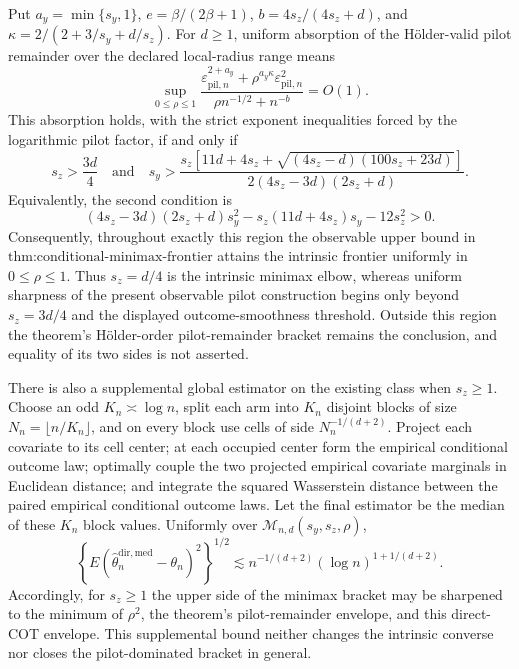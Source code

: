 Put \(a_y=\min\{s_y,1\}\), \(e=\beta/(2\beta+1)\), \(b=4s_z/(4s_z+d)\), and \(\kappa=2/(2+3/s_y+d/s_z)\).  For \(d\ge1\), uniform absorption of the H\"older-valid pilot remainder over the declared local-radius range means
\[
\sup_{0\le\rho\le1}
\frac{\varepsilon_{\mathrm{pil},n}^{2+a_y}+\rho^{a_y\kappa}\varepsilon_{\mathrm{pil},n}^2}
{\rho n^{-1/2}+n^{-b}}=O(1).
\]
This absorption holds, with the strict exponent inequalities forced by the logarithmic pilot factor, if and only if
\[
s_z>\frac{3d}{4}
\quad\text{and}\quad
s_y>
\frac{s_z\!\left[11d+4s_z+\sqrt{(4s_z-d)(100s_z+23d)}\right]}
{2(4s_z-3d)(2s_z+d)}.
\]
Equivalently, the second condition is
\[
(4s_z-3d)(2s_z+d)s_y^2-s_z(11d+4s_z)s_y-12s_z^2>0.
\]
Consequently, throughout exactly this region the observable upper bound in \(\text{thm:conditional-minimax-frontier}\) attains the intrinsic frontier uniformly in \(0\le\rho\le1\).  Thus \(s_z=d/4\) is the intrinsic minimax elbow, whereas uniform sharpness of the present observable pilot construction begins only beyond \(s_z=3d/4\) and the displayed outcome-smoothness threshold.  Outside this region the theorem's H\"older-order pilot-remainder bracket remains the conclusion, and equality of its two sides is not asserted.

There is also a supplemental global estimator on the existing class when \(s_z\ge1\).  Choose an odd \(K_n\asymp\log n\), split each arm into \(K_n\) disjoint blocks of size \(N_n=\lfloor n/K_n\rfloor\), and on every block use cells of side \(N_n^{-1/(d+2)}\).  Project each covariate to its cell center; at each occupied center form the empirical conditional outcome law; optimally couple the two projected empirical covariate marginals in Euclidean distance; and integrate the squared Wasserstein distance between the paired empirical conditional outcome laws.  Let the final estimator be the median of these \(K_n\) block values.  Uniformly over \(\mathcal M_{n,d}(s_y,s_z,\rho)\),
\[
\left\{E(\widehat\theta_n^{\mathrm{dir,med}}-\theta_n)^2\right\}^{1/2}
\lesssim n^{-1/(d+2)}(\log n)^{1+1/(d+2)}.
\]
Accordingly, for \(s_z\ge1\) the upper side of the minimax bracket may be sharpened to the minimum of \(\rho^2\), the theorem's pilot-remainder envelope, and this direct-COT envelope.  This supplemental bound neither changes the intrinsic converse nor closes the pilot-dominated bracket in general.